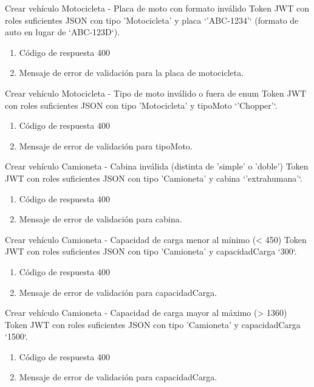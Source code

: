 {Crear vehículo Motocicleta - Placa de moto con formato inválido}
{Token JWT con roles suficientes}
{JSON con tipo 'Motocicleta' y placa `'ABC-1234'` (formato de auto en lugar de `ABC-123D`).}
{\begin{enumerate} [leftmargin=*, nosep]
    \item Código de respuesta 400
    \item Mensaje de error de validación para la placa de motocicleta.
\end{enumerate}}

{Crear vehículo Motocicleta - Tipo de moto inválido o fuera de enum}
{Token JWT con roles suficientes}
{JSON con tipo 'Motocicleta' y tipoMoto `'Chopper'`.}
{\begin{enumerate} [leftmargin=*, nosep]
    \item Código de respuesta 400
    \item Mensaje de error de validación para tipoMoto.
\end{enumerate}}

{Crear vehículo Camioneta - Cabina inválida (distinta de 'simple' o 'doble')}
{Token JWT con roles suficientes}
{JSON con tipo 'Camioneta' y cabina `'extrahumana'`.}
{\begin{enumerate} [leftmargin=*, nosep]
    \item Código de respuesta 400
    \item Mensaje de error de validación para cabina.
\end{enumerate}}

{Crear vehículo Camioneta - Capacidad de carga menor al mínimo (< 450)}
{Token JWT con roles suficientes}
{JSON con tipo 'Camioneta' y capacidadCarga `300`.}
{\begin{enumerate} [leftmargin=*, nosep]
    \item Código de respuesta 400
    \item Mensaje de error de validación para capacidadCarga.
\end{enumerate}}

{Crear vehículo Camioneta - Capacidad de carga mayor al máximo (> 1360)}
{Token JWT con roles suficientes}
{JSON con tipo 'Camioneta' y capacidadCarga `1500`.}
{\begin{enumerate} [leftmargin=*, nosep]
    \item Código de respuesta 400
    \item Mensaje de error de validación para capacidadCarga.
\end{enumerate}}

